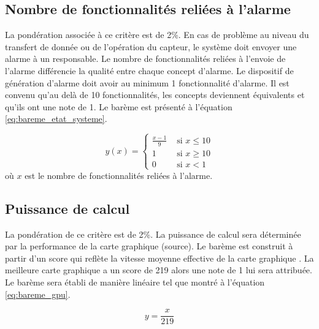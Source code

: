 

\subsection{Nombre de fonctionnalités reliées à l'alarme}

La pondération associée à ce critère est de 2\%. En cas de problème au niveau du transfert de donnée ou de l'opération du capteur, le système doit envoyer une alarme à un responsable. Le nombre de fonctionnalités reliées à l'envoie de l'alarme différencie la qualité entre chaque concept d'alarme. Le dispositif de génération d'alarme doit avoir au minimum 1 fonctionnalité d'alarme. Il est convenu qu'au delà de 10 fonctionnalités, les concepts deviennent équivalents et qu'ils ont une note de 1. Le barème est présenté à l'équation \ref{eq:bareme_etat_systeme}.

\begin{equation}
    y(x) = \begin{cases}
    \frac{x-1}{9} & \text{ si } x \leq 10\\
    1 & \text{ si } x \geq 10\\
    0 & \text{ si } x < 1
    \end{cases}
    \label{eq:bareme_etat_systeme}
\end{equation}
où $x$ est le nombre de fonctionnalités reliées à l'alarme.

\subsection{Puissance de calcul}

La pondération de ce critère est de 2\%. La puissance de calcul sera déterminée par la performance de la carte graphique (source). Le barème est construit à partir d'un score qui reflète la vitesse moyenne effective de la carte graphique \cite{User_Benchmark_score}. La meilleure carte graphique a un score de 219 alors une note de 1 lui sera attribuée. Le barème sera établi de manière linéaire tel que montré à l'équation \ref{eq:bareme_gpu}.

\begin{equation}
    y = \frac{x}{219}
    \label{eq:bareme_gpu}
\end{equation}


